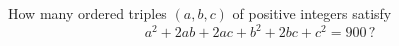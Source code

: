 How many ordered triples $(a,b,c)$ of positive integers satisfy
\[
a^2+2ab+2ac+b^2+2bc+c^2=900\,?
\]
